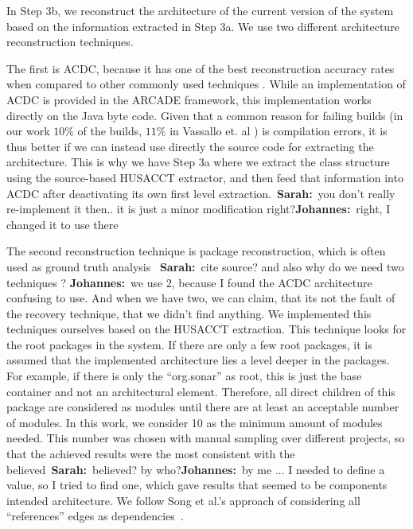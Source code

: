 \documentclass[sigplan, anonymous, review]{acmart}
\newcommand{\sn}[1]{{\color{blue}\textbf{Sarah:}~#1}}
\newcommand{\jk}[1]{{\color{violet}\textbf{Johannes:}~#1}}
\begin{document}


In Step 3b, we reconstruct the architecture of the current version of the system based on the information extracted in Step 3a. We use two different architecture reconstruction techniques.

The first is ACDC, because it has one of the best reconstruction accuracy rates when compared to other commonly used techniques \cite{arcRec-comparison}. 
While an implementation of ACDC is provided in the ARCADE framework, this implementation works directly on the Java byte code.  Given that a common reason for failing builds (in our work $10\%$ of the builds, $11\%$ in Vassallo et. al \cite{CIFailTypes}) is compilation errors, it is thus better if we can instead use directly the source code for extracting the architecture. This is why we have Step 3a where we extract the class structure using the source-based HUSACCT extractor, and then feed that information into ACDC after deactivating its own first level extraction.~\sn{you don't really re-implement it then.. it is just a minor modification right?}\jk{right, I changed it to use there}

The second reconstruction technique is package reconstruction, which is often used as ground truth analysis \cite{arcRec-comparison} ~\sn{cite source? and also why do we need two techniques ?} \jk{we use 2, because I found the ACDC architecture confusing to use. And when we have two, we can claim, that its not the fault of the recovery technique, that we didn't find anything}. We implemented this techniques ourselves based on the HUSACCT extraction.
This technique looks for the root packages in the system. If there are only a few root packages, it is assumed that the implemented architecture lies a level deeper in the packages. For example, if there is only the ``org.sonar'' as root, this is just the base container and not an architectural element. Therefore, all direct children of this package are considered as modules until there are at least an acceptable number of modules. In this work, we consider 10 as the minimum amount of modules needed. This number was chosen with manual sampling over different projects, so that the achieved results were the most consistent with the believed~\sn{believed? by who?}\jk{by me ... I needed to define a value, so I tried to find one, which gave results that seemed to be components} intended architecture. We follow Song et al.'s approach of considering all ``references'' edges as dependencies~\cite{ArcAsGraph}. 
\end{document}
